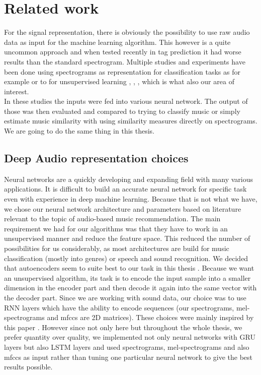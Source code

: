 \section{Related work}\label{sec:audio_related_work}
For the signal representation, there is obviously the possibility to use raw audio data as input for the machine learning algorithm. This however is a quite uncommon approach and when tested recently in tag prediction \cite{6854950} it had worse results than the standard spectrogram. Multiple studies and experiments have been done using spectrograms as representation for classification tasks as for example \cite{wang2014improving} or to for unsupervised learning \cite{van2013deep}, \cite{Ramakrishnan2017song2V}, \cite{NIPS2009_3674}, which is what also our area of interest. \\
In these studies the inputs were fed into various neural network. The output of those was then evaluated and compared to trying to classify music or simply estimate music similarity with using similarity measures directly on spectrograms. We are going to do the same thing in this thesis.

\subsection{Deep Audio representation choices}
Neural networks are a quickly developing and expanding field with many various applications. It is difficult to build an accurate neural network for specific task even with experience in deep machine learning. Because that is not what we have, we chose our neural network architecture and parameters based on literature relevant to the topic of audio-based music recommendation. The main requirement we had for our algorithms was that they have to work in an unsupervised manner and reduce the feature space. This reduced the number of possibilities for us considerably, as most architectures are build for music classification (mostly into genres) or speech and sound recognition. We decided that autoencoders seem to suite best to our task in this thesis .  Because we want an unsupervised algorithm, its task is to encode the input sample into a smaller dimension in the encoder part and then decode it again into the same vector with the decoder part. Since we are working with sound data, our choice was to use RNN layers which have the ability to encode sequences (our spectrograms, mel-spectrograms and mfccs are 2D matrices). These choices were mainly inspired by this paper \cite{inproceedings_RNNs}. However since not only here but throughout the whole thesis, we prefer quantity over quality, we implemented not only neural networks with GRU layers but also LSTM layers and used spectrograms, mel-spectrograms and also mfccs as input rather than tuning one particular neural network to give the best results possible. 